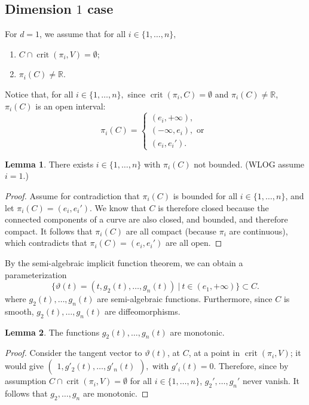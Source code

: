 \documentclass[10pt]{article}
\theoremstyle{definition}
\newtheorem{lemma}{Lemma}
\newcommand{\R}{\mathbb{R}}
\DeclareMathOperator{\crit}{crit}
\begin{document}
\subsection{Dimension $1$ case}
For $d=1$, we assume that for all $i \in \{1,\hdots,n\},$ 
%
\begin{enumerate}
    \item $C \cap \crit(\pi_i,V) = \emptyset$;
    \item $\pi_i(C) \not = \R$.
\end{enumerate}
%
\noindent
Notice that, for all $i \in \{1,\hdots,n\},$ since $\crit(\pi_i,C) = \emptyset$ and $\pi_i(C) \not = \R$, $\pi_i(C)$ is an open interval:
\[
\pi_i(C)=
\begin{cases}
			(e_i,+\infty), \\
                (-\infty,e_i),\textrm{ or }\\
                (e_i,e_i').
\end{cases}
\]
%
\begin{lemma}\label{lemma:unboundedCoordinate}
    There exists $i \in \{1,\hdots,n\}$ with $\pi_i(C)$ not bounded. (WLOG assume $i=1.$)
\end{lemma}
%
%
\begin{proof}
Assume for contradiction that $\pi_i(C)$ is bounded for all $i \in \{1,\hdots,n\}$, and let $\pi_i(C) = (e_i,e_i').$
We know that $C$ is therefore closed because the connected components of a curve are also closed, and bounded, and therefore compact. It follows that $\pi_i(C)$ are all compact (because $\pi_i$ are continuous), which contradicts that $\pi_i(C) = (e_i,e_i')$ are all open. 
\end{proof}
\noindent 
%
By the semi-algebraic implicit function theorem, we can obtain a parameterization
\[
\big\{\vartheta(t) = \left(t,g_2(t),\hdots,g_n(t)\right)~|~ t \in (e_1,+\infty)\big\} \subset C.
\]
where $g_2(t),\hdots,g_n(t)$ are semi-algebraic functions. Furthermore, since $C$ is smooth, $g_2(t),\hdots,g_n(t)$ are diffeomorphisms.
%
\begin{lemma}
The functions $g_2(t),\hdots,g_n(t)$ are monotonic. 
\end{lemma}
%
%
\begin{proof}
Consider the tangent vector to $\vartheta(t)$,
at $C$, at a point in $\crit(\pi_i,V)$; it would give $
\begin{pmatrix}
    1, 
    g'_2(t), 
    \hdots, 
    g'_n(t)
\end{pmatrix},
$ with
$g'_i(t)=0.$ Therefore, since by assumption $C \cap \crit(\pi_i,V) = \emptyset$ for all $i \in \{1,\hdots,n\}$,
$g_2',\hdots,g_n'$ never vanish. It follows that $g_2,\hdots,g_n$ are  monotonic.
\end{proof}
\end{document}
